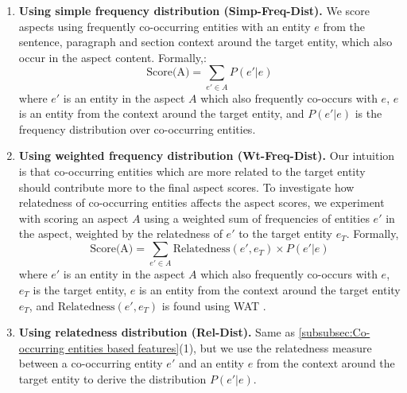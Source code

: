 \documentclass[sigconf,authordraft]{acmart}
\begin{document}
\begin{enumerate}
    \item \textbf{Using simple frequency distribution (Simp-Freq-Dist).} We score aspects using frequently co-occurring entities with an entity $e$ from the sentence, paragraph and section context around the target entity, which also occur in the aspect content. Formally,:
    \begin{equation}
    \label{eq:score-aspect-using-simple-freq-dist}
        \text{Score(A)} = \sum_{e' \in A}P(e' \vert e)
    \end{equation}
    where $e'$ is an entity in the aspect $A$ which also frequently co-occurs with $e$, $e$ is an entity from the context around the target entity, and $P( e' \vert e)$ is the frequency distribution over co-occurring entities.
    
    \item \textbf{Using weighted frequency distribution (Wt-Freq-Dist).} Our intuition is that co-occurring entities which are more related to the target entity should contribute more to the final aspect scores. To investigate how relatedness of co-occurring entities affects the aspect scores, we experiment with scoring an aspect $A$ using a weighted sum of frequencies of entities $e'$ in the aspect, weighted by the relatedness of $e'$ to the target entity $e_T$. Formally,
\begin{equation}
\label{eq:score-aspect-using-weighted-freq-dist}
    \text{Score(A)} = \sum_{e' \in A} \text{Relatedness}(e', e_T) \times P(e' \vert e)
\end{equation}
where $e'$ is an entity in the aspect $A$ which also frequently co-occurs with $e$, $e_T$ is the target entity, $e$ is an entity from the context around the target entity $e_T$, and $\text{Relatedness}(e', e_T)$ is found using WAT \cite{piccinno2014wat}.

\item \textbf{Using relatedness distribution (Rel-Dist).} Same as \ref{subsubsec:Co-occurring entities based features}(1), but we use the relatedness measure between a co-occurring entity $e'$ and an entity $e$ from the context around the target entity to derive the distribution $P( e' \vert e)$.
\end{enumerate}
\end{document}
